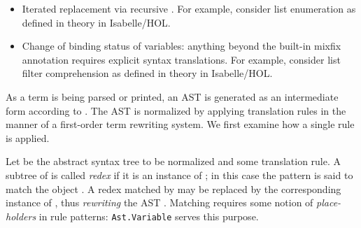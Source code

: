 \begin{isabellebody}
\begin{isamarkuptext}
  \begin{itemize}

  \item Iterated replacement via recursive \hyperlink{command.translations}{\mbox{}}.
  For example, consider list enumeration  as
  defined in theory  in Isabelle/HOL.

  \item Change of binding status of variables: anything beyond the
  built-in \hyperlink{keyword.binder}{\mbox{}} mixfix annotation requires explicit
  syntax translations.  For example, consider list filter
  comprehension  as defined in theory  in Isabelle/HOL.

  \end{itemize}%
\end{isamarkuptext}%
\isamarkuptrue%
%
\isamarkuptrue%
%
\begin{isamarkuptext}%
As a term is being parsed or printed, an AST is generated as
  an intermediate form according to .  The AST
  is normalized by applying translation rules in the manner of a
  first-order term rewriting system.  We first examine how a single
  rule is applied.

  Let  be the abstract syntax tree to be normalized and
   some translation rule.  A subtree 
  of  is called \emph{redex} if it is an instance of ; in this case the pattern  is said to match the
  object .  A redex matched by  may be
  replaced by the corresponding instance of , thus
  \emph{rewriting} the AST .  Matching requires some notion
  of \emph{place-holders} in rule patterns: \verb|Ast.Variable| serves
  this purpose.


\end{isamarkuptext}
\end{isabellebody}
